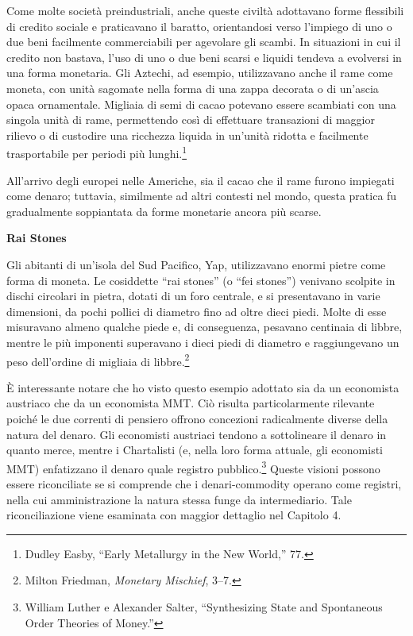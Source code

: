 \documentclass[
  a5paper,
  smalldemyvopaper,10pt,twoside,onecolumn,openright,extrafontsizes,hidelinks]{memoir}
\begin{document}
Come molte società preindustriali, anche queste civiltà adottavano forme
flessibili di credito sociale e praticavano il baratto, orientandosi
verso l'impiego di uno o due beni facilmente commerciabili per agevolare
gli scambi. In situazioni in cui il credito non bastava, l'uso di uno o
due beni scarsi e liquidi tendeva a evolversi in una forma monetaria.
Gli Aztechi, ad esempio, utilizzavano anche il rame come moneta, con
unità sagomate nella forma di una zappa decorata o di un'ascia opaca
ornamentale. Migliaia di semi di cacao potevano essere scambiati con una
singola unità di rame, permettendo così di effettuare transazioni di
maggior rilievo o di custodire una ricchezza liquida in un'unità ridotta
e facilmente trasportabile per periodi più lunghi.\footnote{Dudley
  Easby, ``Early Metallurgy in the New World,'' 77.}

All'arrivo degli europei nelle Americhe, sia il cacao che il rame furono
impiegati come denaro; tuttavia, similmente ad altri contesti nel mondo,
questa pratica fu gradualmente soppiantata da forme monetarie ancora più
scarse.

\textbf{Rai Stones}

Gli abitanti di un'isola del Sud Pacifico, Yap, utilizzavano enormi
pietre come forma di moneta. Le cosiddette ``rai stones'' (o ``fei
stones'') venivano scolpite in dischi circolari in pietra, dotati di un
foro centrale, e si presentavano in varie dimensioni, da pochi pollici
di diametro fino ad oltre dieci piedi. Molte di esse misuravano almeno
qualche piede e, di conseguenza, pesavano centinaia di libbre, mentre le
più imponenti superavano i dieci piedi di diametro e raggiungevano un
peso dell'ordine di migliaia di libbre.\footnote{Milton Friedman,
  \emph{Monetary Mischief}, 3--7.}

È interessante notare che ho visto questo esempio adottato sia da un
economista austriaco che da un economista MMT. Ciò risulta
particolarmente rilevante poiché le due correnti di pensiero offrono
concezioni radicalmente diverse della natura del denaro. Gli economisti
austriaci tendono a sottolineare il denaro in quanto merce, mentre i
Chartalisti (e, nella loro forma attuale, gli economisti MMT)
enfatizzano il denaro quale registro pubblico.\footnote{William Luther e
  Alexander Salter, ``Synthesizing State and Spontaneous Order Theories
  of Money.''} Queste visioni possono essere riconciliate se si
comprende che i denari-commodity operano come registri, nella cui
amministrazione la natura stessa funge da intermediario. Tale
riconciliazione viene esaminata con maggior dettaglio nel Capitolo 4.
\end{document}
